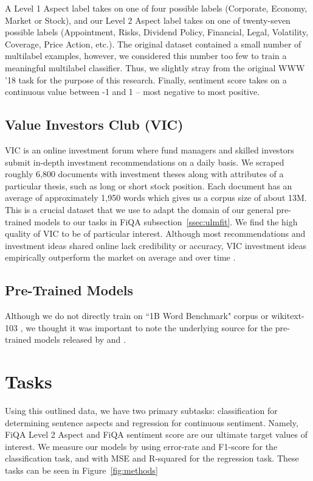 \documentclass[11pt,a4paper]{article}
\begin{document}
A Level 1 Aspect label takes on one of four possible labels (Corporate, Economy, Market or Stock), and our Level 2 Aspect label takes on one of  twenty-seven possible labels (Appointment, Risks, Dividend Policy, Financial, Legal, Volatility, Coverage, Price Action, etc.). The original dataset contained a small number of multilabel examples, however, we considered this number too few to train a meaningful multilabel classifier. Thus, we slightly stray from the original WWW '18 task for the purpose of this research. Finally, sentiment score takes on a continuous value between -1 and 1 -- most negative to most positive.

\subsection{Value Investors Club (VIC)}
VIC is an online investment forum where fund managers and skilled investors submit in-depth investment recommendations on a daily basis.  We scraped roughly 6,800 documents with investment theses along with attributes of a particular thesis, such as long or short stock position. Each document has an average of approximately 1,950 words which gives us a corpus size of about 13M. This is a crucial dataset that we use to adapt the domain of our general pre-trained models to our tasks in FiQA subsection~\ref{ssec:ulmfit}. We find the high quality of VIC to be of particular interest. Although most recommendations and investment ideas shared online lack credibility or accuracy, VIC investment ideas empirically outperform the market on average and over time \cite{gray2012fund}.

\subsection{Pre-Trained Models}
Although we do not directly train on ``1B Word Benchmark" corpus \cite{chelba2013one} or wikitext-103 \cite{merity2016pointer}, we thought it was important to note the underlying source for the pre-trained models released by  and .

\section{Tasks}
\label{sec:tasks}
Using this outlined data, we have two primary subtasks: classification for determining sentence aspects and regression for continuous sentiment. Namely, FiQA Level 2 Aspect and FiQA sentiment score are our ultimate target values of interest. We measure our models by using error-rate and F1-score for the classification task, and with MSE and R-squared for the regression task. These tasks can be seen in Figure~\ref{fig:methods}
\end{document}

